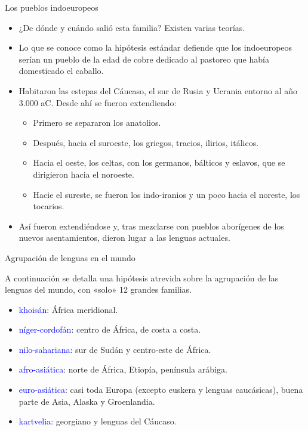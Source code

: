 \documentclass[handout]{beamer}
\begin{document}
\begin{frame}{Los pueblos indoeuropeos}
\begin{itemize}
	\item ¿De dónde y cuándo salió esta familia? Existen varias teorías.
	\item Lo que se conoce como la hipótesis estándar defiende que los indoeuropeos serían un pueblo de la edad de cobre dedicado al pastoreo que había domesticado el caballo.
	\item Habitaron las estepas del Cáucaso, el sur de Rusia y Ucrania entorno al año 3.000 aC. Desde ahí se fueron extendiendo:
	\begin{itemize}
		\item Primero se separaron los anatolios. 
		\item Después, hacia el suroeste, los griegos, tracios, ilirios, itálicos.
		\item Hacia el oeste, los celtas, con los germanos, bálticos y eslavos, que se dirigieron hacia el noroeste.
		\item Hacie el sureste, se fueron los indo-iranios y un poco hacia el noreste, los tocarios. 
	\end{itemize}
	\item Así fueron extendiéndose y, tras mezclarse con pueblos aborígenes de los nuevos asentamientos, dieron lugar a las lenguas actuales.
\end{itemize}
\end{frame}


\begin{frame}{Agrupación de lenguas en el mundo}

A continuación se detalla una hipótesis atrevida sobre la agrupación de las lenguas del mundo, con «solo» 12 grandes familias.

\begin{itemize}
	\item \textcolor{blue}{khoisán}: África meridional.
	\item \textcolor{blue}{níger-cordofán}: centro de África, de costa a costa. 
	\item \textcolor{blue}{nilo-sahariana}: sur de Sudán y centro-este de África.
	\item \textcolor{blue}{afro-asiática}: norte de África, Etiopía, península arábiga.
	\item \textcolor{blue}{euro-asiática}: casi toda Europa (excepto euskera y lenguas caucásicas), buena parte de Asia, Alaska y Groenlandia.
	\item \textcolor{blue}{kartvelia}: georgiano y lenguas del Cáucaso.
\end{itemize}
\end{frame}
\end{document}
